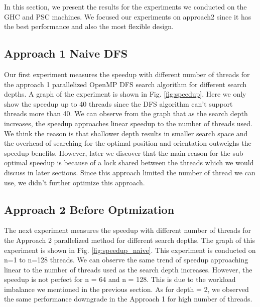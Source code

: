 In this section, we present the results for the experiments we conducted on the GHC and PSC machines. We focused our experiments on approach2 since it has the best performance and also the most flexible design. 

\subsection{Approach 1 Naive DFS}
Our first experiment measures the speedup with different number of threads for the approach 1 parallelized OpenMP DFS search algorithm for different search depths. A graph of the experiment is shown in Fig. \ref{fig:speedup}. Here we only show the speedup up to 40 threads since the DFS algorithm can't support threads more than 40. We can observe from the graph that as the search depth increases, the speedup approaches linear speedup to the number of threads used. We think the reason is that shallower depth results in smaller search space and the overhead of searching for the optimal position and orientation outweighs the speedup benefits. However, later we discover that the main reason for the sub-optimal speedup is because of a lock shared between the threads which we would discuss in later sections. Since this approach limited the number of thread we can use, we didn't further optimize this approach.

\subsection{Approach 2 Before Optmization}
The next experiment measures the speedup with different number of threads for the Approach 2 parallelized method for different search depths. The graph of this experiment is shown in Fig. \ref{fig:speedup_naive}. This experiment is conducted on n=1 to n=128 threads. We can observe the same trend of speedup approaching linear to the number of threads used as the search depth increases. However, the speedup is not perfect for n = 64 and n = 128. This is due to the workload imbalance we mentioned in the previous section. As for depth = 2, we observed the same performance downgrade in the Approach 1 for high number of threads. 

